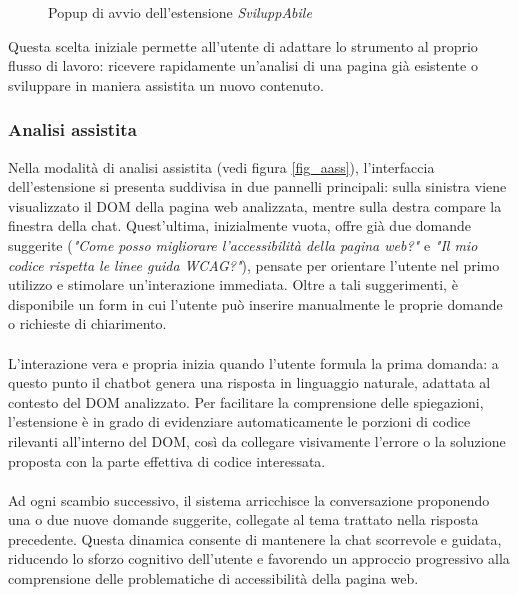 \begin{figure}[H]
    \centering
    \caption{Popup di avvio dell'estensione \textit{SviluppAbile}}\label{fig:popup}
\end{figure}

\noindent Questa scelta iniziale permette all’utente di adattare lo strumento al proprio flusso di lavoro: ricevere rapidamente un’analisi di una pagina già esistente o sviluppare in maniera assistita un nuovo contenuto.

\subsubsection{Analisi assistita}
\noindent Nella modalità di analisi assistita (vedi figura \ref{fig_aass}), l’interfaccia dell’estensione si presenta suddivisa in due pannelli principali: sulla sinistra viene visualizzato il DOM della pagina web analizzata, mentre sulla destra compare la finestra della chat. Quest’ultima, inizialmente vuota, offre già due domande suggerite (\textit{"Come posso migliorare l'accessibilità della pagina web?"} e \textit{"Il mio codice rispetta le linee guida WCAG?"}), pensate per orientare l’utente nel primo utilizzo e stimolare un’interazione immediata. Oltre a tali suggerimenti, è disponibile un form in cui l’utente può inserire manualmente le proprie domande o richieste di chiarimento.\\
\\
L’interazione vera e propria inizia quando l’utente formula la prima domanda: a questo punto il chatbot genera una risposta in linguaggio naturale, adattata al contesto del DOM analizzato. Per facilitare la comprensione delle spiegazioni, l’estensione è in grado di evidenziare automaticamente le porzioni di codice rilevanti all’interno del DOM, così da collegare visivamente l’errore o la soluzione proposta con la parte effettiva di codice interessata.\\
\\
Ad ogni scambio successivo, il sistema arricchisce la conversazione proponendo una o due nuove domande suggerite, collegate al tema trattato nella risposta precedente. Questa dinamica consente di mantenere la chat scorrevole e guidata, riducendo lo sforzo cognitivo dell’utente e favorendo un approccio progressivo alla comprensione delle problematiche di accessibilità della pagina web.

